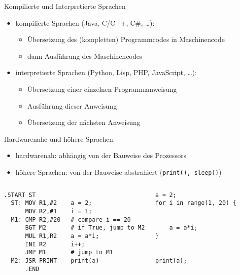 \begin{frame}[fragile]{Kompilierte und Interpretierte Sprachen}
    \begin{itemize}
        \item kompilierte Sprachen (Java, C/C++, C\#, \dots):
        \begin{itemize}
            \item Übersetzung des (kompletten) Programmcodes in Maschinencode
            \item dann Ausführung des Maschinencodes
        \end{itemize}
        \item interpretierte Sprachen (Python, Lisp, PHP, JavaScript, \dots):
        \begin{itemize}
            \item Übersetzung einer einzelnen Programmanweisung
            \item Ausführung dieser Anweisung
            \item Übersetzung der nächsten Anweisung
        \end{itemize}
    \end{itemize}
\end{frame}

\begin{frame}[fragile]{Hardwarenahe und höhere Sprachen}
\begin{itemize}
    \item hardwarenah: abhängig von der Bauweise des Prozessors
    \item höhere Sprachen: von der Bauweise abstrahiert (\texttt{print(), sleep()})
\end{itemize}
\begin{columns}
    \begin{lstlisting}
.START ST
  ST: MOV R1,#2
      MOV R2,#1
  M1: CMP R2,#20
      BGT M2
      MUL R1,R2
      INI R2
      JMP M1
  M2: JSR PRINT
      .END
    \end{lstlisting}
    \begin{lstlisting}

a = 2;
i = 1;
# compare i == 20
# if True, jump to M2
a = a*i;
i++;
# jump to M1
print(a)
    \end{lstlisting}
    \begin{lstlisting}
a = 2;
for i in range(1, 20) {


    a = a*i;
}
 
 
print(a);

    \end{lstlisting}
\end{columns}
\end{frame}


